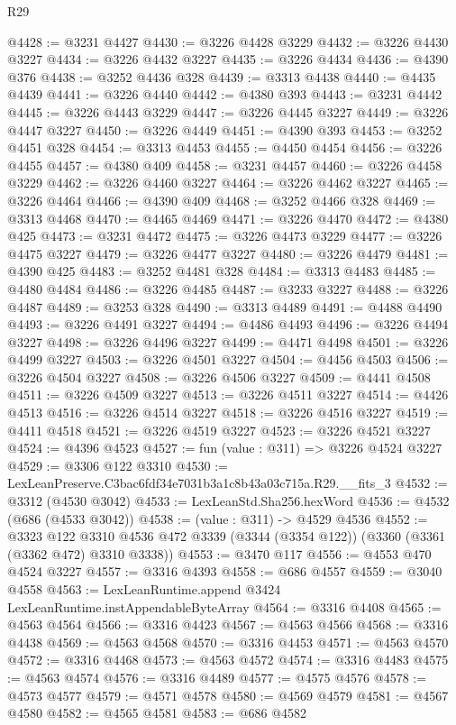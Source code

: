 \begin{lexlean}{R29}
\begin{coremodule}
@4428 := @3231 @4427
@4430 := @3226 @4428 @3229
@4432 := @3226 @4430 @3227
@4434 := @3226 @4432 @3227
@4435 := @3226 @4434
@4436 := @4390 @376
@4438 := @3252 @4436 @328
@4439 := @3313 @4438
@4440 := @4435 @4439
@4441 := @3226 @4440
@4442 := @4380 @393
@4443 := @3231 @4442
@4445 := @3226 @4443 @3229
@4447 := @3226 @4445 @3227
@4449 := @3226 @4447 @3227
@4450 := @3226 @4449
@4451 := @4390 @393
@4453 := @3252 @4451 @328
@4454 := @3313 @4453
@4455 := @4450 @4454
@4456 := @3226 @4455
@4457 := @4380 @409
@4458 := @3231 @4457
@4460 := @3226 @4458 @3229
@4462 := @3226 @4460 @3227
@4464 := @3226 @4462 @3227
@4465 := @3226 @4464
@4466 := @4390 @409
@4468 := @3252 @4466 @328
@4469 := @3313 @4468
@4470 := @4465 @4469
@4471 := @3226 @4470
@4472 := @4380 @425
@4473 := @3231 @4472
@4475 := @3226 @4473 @3229
@4477 := @3226 @4475 @3227
@4479 := @3226 @4477 @3227
@4480 := @3226 @4479
@4481 := @4390 @425
@4483 := @3252 @4481 @328
@4484 := @3313 @4483
@4485 := @4480 @4484
@4486 := @3226 @4485
@4487 := @3233 @3227
@4488 := @3226 @4487
@4489 := @3253 @328
@4490 := @3313 @4489
@4491 := @4488 @4490
@4493 := @3226 @4491 @3227
@4494 := @4486 @4493
@4496 := @3226 @4494 @3227
@4498 := @3226 @4496 @3227
@4499 := @4471 @4498
@4501 := @3226 @4499 @3227
@4503 := @3226 @4501 @3227
@4504 := @4456 @4503
@4506 := @3226 @4504 @3227
@4508 := @3226 @4506 @3227
@4509 := @4441 @4508
@4511 := @3226 @4509 @3227
@4513 := @3226 @4511 @3227
@4514 := @4426 @4513
@4516 := @3226 @4514 @3227
@4518 := @3226 @4516 @3227
@4519 := @4411 @4518
@4521 := @3226 @4519 @3227
@4523 := @3226 @4521 @3227
@4524 := @4396 @4523
@4527 := fun (value : @311) => @3226 @4524 @3227
@4529 := @3306 @122 @3310
@4530 := LexLeanPreserve.C3bac6fdf34e7031b3a1c8b43a03c715a.R29.__fits_3
@4532 := @3312 (@4530 @3042)
@4533 := LexLeanStd.Sha256.hexWord
@4536 := @4532 (@686 (@4533 @3042))
@4538 := (value : @311) -> @4529 @4536
@4552 := @3323
    @122
    @3310
    @4536
    @472
    @3339
    (@3344 (@3354 @122))
    (@3360 (@3361 (@3362 @472) @3310 @3338))
@4553 := @3470 @117
@4556 := @4553 @470 @4524 @3227
@4557 := @3316 @4393
@4558 := @686 @4557
@4559 := @3040 @4558
@4563 := LexLeanRuntime.append @3424 LexLeanRuntime.instAppendableByteArray
@4564 := @3316 @4408
@4565 := @4563 @4564
@4566 := @3316 @4423
@4567 := @4563 @4566
@4568 := @3316 @4438
@4569 := @4563 @4568
@4570 := @3316 @4453
@4571 := @4563 @4570
@4572 := @3316 @4468
@4573 := @4563 @4572
@4574 := @3316 @4483
@4575 := @4563 @4574
@4576 := @3316 @4489
@4577 := @4575 @4576
@4578 := @4573 @4577
@4579 := @4571 @4578
@4580 := @4569 @4579
@4581 := @4567 @4580
@4582 := @4565 @4581
@4583 := @686 @4582

\end{coremodule}
\end{lexlean}
